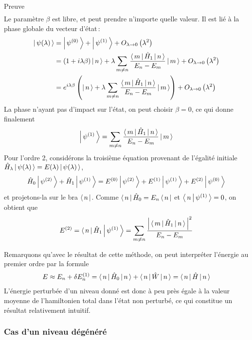 \begin{demo}{Preuve}
\begin{align*}
    \end{align*} 
    Le paramètre $\beta$ est libre, et peut prendre n’importe quelle valeur. Il est lié à la phase globale du vecteur d’état :
    \begin{align*}
        \left| \, \psi(\lambda) \, \right> 
        &= \left| \, \psi^{(0)} \, \right> + \left| \, \psi^{(1)} \, \right> + O_{\lambda \to 0} \left(\lambda^2\right) \\
        &= \left(1 + i \lambda \beta\right) \left| \, n \, \right> + \lambda \sum_{m \neq n} \frac{\left< \, m \, \right| \hat{H}_1 \left| \, n \, \right>}{E_n - E_m} \left| \, m \, \right> + O_{\lambda \to 0} \left(\lambda^2\right) \\
        &= e^{i \lambda \beta} \left(\left| \, n \, \right> + \lambda \sum_{m \neq n} \frac{\left< \, m \, \right| \hat{H}_1 \left| \, n \, \right>}{E_n - E_m} \left| \, m \, \right> \right) + O_{\lambda \to 0} \left(\lambda^2\right)
    \end{align*}
    La phase n’ayant pas d’impact sur l’état, on peut choisir $\beta = 0$, ce qui donne finalement 
    \[ \left| \, \psi^{(1)} \, \right> = \sum_{m \neq n} \frac{\left< \, m \, \right| \hat{H}_1 \left| \, n \, \right>}{E_n - E_m} \left| \, m \, \right> \]   
    Pour l’ordre 2, considérons la troisième équation provenant de l’égalité initiale $\hat{H}_{\lambda} \left| \, \psi(\lambda) \, \right> = E(\lambda) \left| \, \psi(\lambda) \, \right>$, 
    \[ \hat{H}_0 \left| \, \psi^{(2)} \, \right> + \hat{H}_1 \left| \, \psi^{(1)} \, \right> =  E^{(0)} \left| \, \psi^{(2)} \, \right> + E^{(1)} \left| \, \psi^{(1)} \, \right> + E^{(2)} \left| \, \psi^{(0)} \, \right> \]    
    et projetons-la sur le bra $\left< \, n \, \right|$. Comme $\left< \, n \, \right|\hat{H}_0 = E_n \left< \, n \, \right|$ et $\left< \, n \, \middle| \, \psi^{(1)} \, \right> = 0$, on obtient que 
    \[ E^{(2)} = \left< \, n \, \right| \hat{H}_1 \left| \, \psi^{(1)} \, \right> = \sum_{m \neq n} \frac{\left\lvert \, \left< \, m \, \right| \hat{H}_1 \left| \, n \, \right> \, \right\rvert^2}{E_n - E_m} \]  
    \end{demo}

    Remarquons qu’avec le résultat de cette méthode, on peut interpréter l’énergie au premier ordre par la formule 
    \[ E \approx E_n + \delta E_n^{(1)} = \left< \, n \, \right| \hat{H}_0 \left| \, n \, \right> + \left< \, n \, \right| \hat{W} \left| \, n \, \right> = \left< \, n \, \right| \hat{H} \left| \, n \, \right> \]   
    L’énergie perturbée d’un niveau donné est donc à peu près égale à la valeur moyenne de l’hamiltonien total dans l’état non perturbé, ce qui constitue un résultat relativement intuitif.


        \subsubsection{Cas d’un niveau dégénéré}

